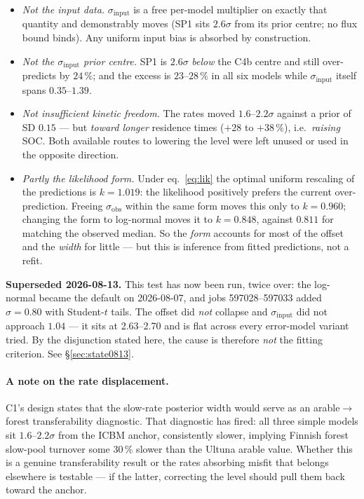 \documentclass[11pt]{article}
\newcommand{\sinput}{\sigma_{\mathrm{input}}}
\newcommand{\sobs}{\sigma_{\mathrm{obs}}}
\begin{document}
\begin{itemize}
\item \emph{Not the input data.} $\sinput$ is a free per-model multiplier on exactly that
quantity and demonstrably moves (SP1 sits $2.6\sigma$ from its prior centre; no flux bound
binds). Any uniform input bias is absorbed by construction.
\item \emph{Not the $\sinput$ prior centre.} SP1 is $2.6\sigma$ \emph{below} the C4b centre and
still over-predicts by $24\,\%$; and the excess is $23$--$28\,\%$ in all six models while
$\sinput$ itself spans $0.35$--$1.39$.
\item \emph{Not insufficient kinetic freedom.} The rates moved $1.6$--$2.2\sigma$ against a
prior of SD $0.15$ --- but \emph{toward longer} residence times ($+28$ to $+38\,\%$), i.e.\
\emph{raising} SOC. Both available routes to lowering the level were left unused or used in the
opposite direction.
\item \emph{Partly the likelihood form.} Under eq.~\eqref{eq:lik} the optimal uniform rescaling
of the predictions is $k = 1.019$: the likelihood positively prefers the current
over-prediction. Freeing $\sobs$ within the same form moves this only to $k = 0.960$; changing
the form to log-normal moves it to $k = 0.848$, against $0.811$ for matching the observed
median. So the \emph{form} accounts for most of the offset and the \emph{width} for little ---
but this is inference from fitted predictions, not a refit.
\end{itemize}

\begin{caveat}
\textbf{Superseded 2026-08-13.} This test has now been run, twice over: the log-normal became the
default on 2026-08-07, and jobs 597028--597033 added $\sigma = 0.80$ with Student-$t$ tails. The
offset did \emph{not} collapse and $\sinput$ did not approach $1.04$ --- it sits at 2.63--2.70 and
is flat across every error-model variant tried. By the disjunction stated here, the cause is
therefore \emph{not} the fitting criterion. See \S\ref{sec:state0813}.
\end{caveat}

\paragraph{A note on the rate displacement.} C1's design states that the slow-rate posterior
width would serve as an arable$\rightarrow$forest transferability diagnostic. That diagnostic
has fired: all three simple models sit $1.6$--$2.2\sigma$ from the ICBM anchor, consistently
slower, implying Finnish forest slow-pool turnover some $30\,\%$ slower than the Ultuna arable
value. Whether this is a genuine transferability result or the rates absorbing misfit that
belongs elsewhere is testable --- if the latter, correcting the level should pull them back
toward the anchor.
\end{document}
